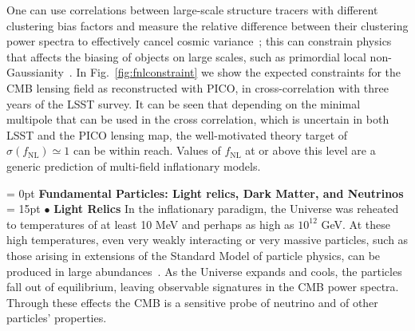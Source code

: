 \documentclass[PICOReport.tex]{subfiles}
\begin{document}
One can use correlations between large-scale structure tracers with different clustering bias factors and measure the relative difference between their clustering power spectra to effectively cancel cosmic variance~\citep{2009PhRvL.102b1302S,2018PhRvD..97l3540S}; this can constrain physics that affects the biasing of objects on large scales, such as primordial local non-Gaussianity~\citep{2008PhRvD..77l3514D}.  In Fig.~\ref{fig:fnlconstraint} we show the expected constraints for the CMB lensing field as reconstructed with PICO, in cross-correlation with  three years of the LSST survey. It can be seen that depending on the minimal multipole that can be used in the cross correlation, which is uncertain in both LSST and the PICO lensing map, the well-motivated theory target of $\sigma (f_\mathrm{NL}) \simeq 1$ \citep{2014arXiv1412.4671A} can be within reach. Values of $f_\mathrm{NL}$ at or above this level are a generic prediction of multi-field inflationary models.


\vspace{0.1in}
\parindent = 0pt
{\bf Fundamental Particles: Light relics, Dark Matter, and Neutrinos} \\ %
\parindent = 15pt
$\bullet$ {\bf Light Relics} \hspace{0.1in} In the inflationary paradigm, the Universe was reheated to temperatures of 
at least 10 MeV and perhaps as 
high as $10^{12}$ GeV.  At these high temperatures, even very weakly interacting or very massive particles, 
such as those arising in extensions of the Standard Model of particle physics, can be produced in large 
abundances~\cite{1979ARNPS..29..313S,Bolz:2000fu}.  As the Universe expands and cools, 
the particles fall out of equilibrium, leaving observable signatures in the CMB power spectra.
Through these effects the CMB is a sensitive probe of neutrino and of other particles' properties.  

\end{document}
